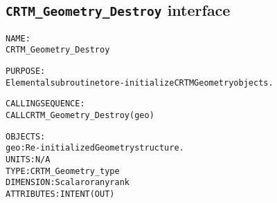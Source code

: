 \subsection{\texttt{CRTM\_Geometry\_Destroy} interface}
  \label{sec:CRTM_Geometry_Destroy_interface}
  \begin{alltt}
 
  NAME:
        CRTM_Geometry_Destroy
  
  PURPOSE:
        Elemental subroutine to re-initialize CRTM Geometry objects.
 
  CALLING SEQUENCE:
        CALL CRTM_Geometry_Destroy( geo )
 
  OBJECTS:
        geo:          Re-initialized Geometry structure.
                      UNITS:      N/A
                      TYPE:       CRTM_Geometry_type
                      DIMENSION:  Scalar or any rank
                      ATTRIBUTES: INTENT(OUT)
 
  \end{alltt}

